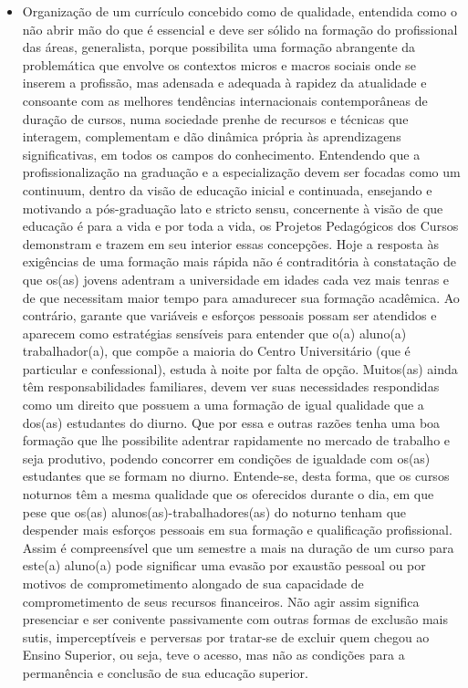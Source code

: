 \documentclass[a4paper, 12pt, openright, oneside, german, french, english, brazil]{abntex2}
\begin{document}
\begin{itemize}
\item Organização de um currículo concebido como de qualidade, entendida como o não abrir mão do que é essencial e deve ser sólido na formação do profissional das áreas, generalista, porque possibilita uma formação abrangente da problemática que envolve os contextos micros e macros sociais onde se inserem a profissão, mas adensada e adequada à rapidez da atualidade e consoante com as melhores tendências internacionais contemporâneas de duração de cursos, numa sociedade prenhe de recursos e técnicas que interagem, complementam e dão dinâmica própria às aprendizagens significativas, em todos os campos do conhecimento. Entendendo que a profissionalização na graduação e a especialização devem ser focadas como um continuum, dentro da visão de educação inicial e continuada, ensejando e motivando a pós-graduação lato e stricto sensu, concernente à visão de que educação é para a vida e por toda a vida, os Projetos Pedagógicos dos Cursos demonstram e trazem em seu interior essas concepções. Hoje a resposta às exigências de uma formação mais rápida não é contraditória à constatação de que os(as) jovens adentram a universidade em idades cada vez mais tenras e de que necessitam maior tempo para amadurecer sua formação acadêmica. Ao contrário, garante que variáveis e esforços pessoais possam ser atendidos e aparecem como estratégias sensíveis para entender que o(a) aluno(a) trabalhador(a), que compõe a maioria do Centro Universitário (que é particular e confessional), estuda à noite por falta de opção. Muitos(as) ainda têm responsabilidades familiares, devem ver suas necessidades respondidas como um direito que possuem a uma formação de igual qualidade que a dos(as) estudantes do diurno. Que por essa e outras razões tenha uma boa formação que lhe possibilite adentrar rapidamente no mercado de trabalho e seja produtivo, podendo concorrer em condições de igualdade com os(as) estudantes que se formam no diurno. Entende-se, desta forma, que os cursos noturnos têm a mesma qualidade que os oferecidos durante o dia, em que pese que os(as) alunos(as)-trabalhadores(as) do noturno tenham que despender mais esforços pessoais em sua formação e qualificação profissional. Assim é compreensível que um semestre a mais na duração de um curso para este(a) aluno(a) pode significar uma evasão por exaustão pessoal ou por motivos de comprometimento alongado de sua capacidade de comprometimento de seus recursos financeiros. Não agir assim significa presenciar e ser conivente passivamente com outras formas de exclusão mais sutis, imperceptíveis e perversas por tratar-se de excluir quem chegou ao Ensino Superior, ou seja, teve o acesso, mas não as condições para a permanência e conclusão de sua educação superior.


\end{itemize}
\end{document}
